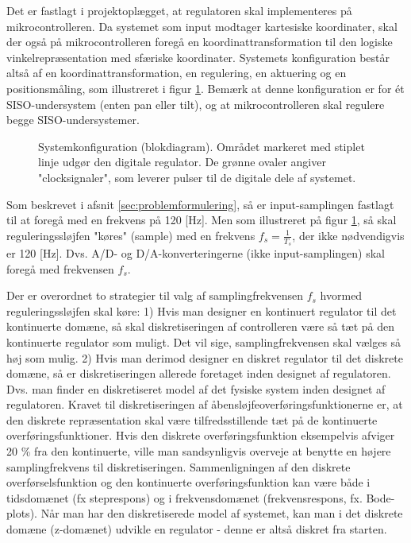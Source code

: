 Det er fastlagt i projektoplægget, at regulatoren skal implementeres på mikrocontrolleren.
Da systemet som input modtager kartesiske koordinater,
skal der også på mikrocontrolleren foregå en koordinattransformation
til den logiske vinkelrepræsentation med sfæriske koordinater.
Systemets konfiguration består altså af en koordinattransformation,
en regulering, en aktuering og en positionsmåling, som illustreret
i figur \ref{fig:digitalkontroller1}.
Bemærk at denne konfiguration er for ét SISO-undersystem (enten pan eller tilt),
og at mikrocontrolleren skal regulere begge SISO-undersystemer.
\begin{figure}[!th]
\centering
\begin{tikzpicture}[auto, node distance=2.6cm,>=latex']

\end{tikzpicture}
\caption[Systemkonfiguration]{Systemkonfiguration (blokdiagram).
	Området markeret med stiplet linje udgør den digitale regulator.
	De grønne ovaler angiver "clocksignaler", som leverer pulser til de digitale dele af systemet.}
\label{fig:digitalkontroller1}
\end{figure}
Som beskrevet i afsnit \ref{sec:problemformulering},
så er input-samplingen fastlagt til at foregå med en frekvens på 120 [Hz].
Men som illustreret på figur \ref{fig:digitalkontroller1}, så skal reguleringssløjfen
"køres" (sample) med en frekvens \(f_s=\frac{1}{T_s}\), der ikke nødvendigvis er 120 [Hz].
Dvs. A/D- og D/A-konverteringerne (ikke input-samplingen) skal foregå med frekvensen \(f_s\).

Der er overordnet to strategier til valg af samplingfrekvensen \(f_s\) hvormed
reguleringssløjfen skal køre:
1) Hvis man designer en kontinuert regulator til det kontinuerte domæne, så
skal diskretiseringen af controlleren være så tæt på den kontinuerte regulator som muligt.
Det vil sige, samplingfrekvensen skal vælges så høj som mulig.
2) Hvis man derimod designer en diskret regulator til det diskrete domæne,
så er diskretiseringen allerede foretaget inden designet af regulatoren.
Dvs. man finder en diskretiseret model af det fysiske system inden designet af regulatoren.
Kravet til diskretiseringen af åbensløjfeoverføringsfunktionerne er, at den diskrete repræsentation
skal være tilfredsstillende tæt på de kontinuerte overføringsfunktioner.
Hvis den diskrete overføringsfunktion eksempelvis afviger 20 \% fra den kontinuerte, ville man
sandsynligvis overveje at benytte en højere samplingfrekvens til diskretiseringen.
Sammenligningen af den diskrete overførselsfunktion og den kontinuerte overføringsfunktion
kan være både i tidsdomænet (fx steprespons) og i frekvensdomænet (frekvensrespons, fx. Bode-plots).
Når man har den diskretiserede model af systemet, kan man i det diskrete domæne (z-domænet)
udvikle en regulator - denne er altså diskret fra starten.

